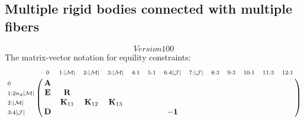 \documentclass[a4paper,10pt]{article}
\begin{document}
\begin{landscape}
\subsection{Multiple rigid bodies connected with multiple fibers}
\[Version 100\]
The matrix-vector notation for equility constraints:
\begin{equation}\notag
\bordermatrix{
                                        & \scriptstyle{0      }        &   \scriptstyle{1 : |\mathcal{M}|}           &  \scriptstyle{2 : |\mathcal{M}|}           & \scriptstyle{3 : |\mathcal{M}|}            &  \scriptstyle{4 : 1}    & \scriptstyle{5 : 1}    &  \scriptstyle{6:4| \mathcal{J} | }  &  \scriptstyle{7 : | \mathcal{J} |}     &  \scriptstyle{8 : 3} &  \scriptstyle{9:3} & \scriptstyle{10:1}  &  \scriptstyle{11:3}  & \scriptstyle{12:1}  \cr
\scriptstyle{0      }                   &\mathbf{A}                    &                                             &                                            &                                            &                         &                        &                                     &                                        &                      &                    &                     &                      &                     \cr
\scriptstyle{1 : 2n_d|\mathcal{M}|}     &\mathbf{E}                    &   \mathbf{R}                                &                                            &                                            &                         &                        &                                     &                                        &                      &                    &                     &                      &                     \cr
\scriptstyle{2 : |\mathcal{M}|}         &                              &   \mathbf{K}_{11}                           &  \mathbf{K}_{12}                           & \mathbf{K}_{13}                            &                         &                        &                                     &                                        &                      &                    &                     &                      &                     \cr
\scriptstyle{3 : 4| \mathcal{J} | }     &\mathbf{D}                    &                                             &                                            &                                            &                         &                        &  -\mathbf{1}                        &                                        &                      &                    &                     &                      &                     \cr
}
\end{equation}
\end{landscape}
\end{document}
